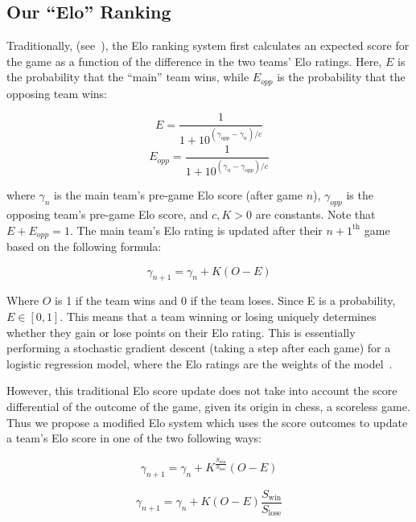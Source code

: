 \documentclass{article}
\begin{document}
\subsection{Our ``Elo'' Ranking}
Traditionally, (see~\cite{mediumRatingSystem}), the Elo ranking system first calculates an expected score for the game as a function of the difference in the two teams' Elo ratings. Here, $E$ is the probability that the ``main'' team wins, while $E_{opp}$ is the probability that the opposing team wins:

\begin{equation}\label{eq:E}
E = \frac{1}{1+10^{(\gamma_{opp}-\gamma_n)/c}}
\end{equation}
\begin{equation}\label{eq:E_opp}
E_{opp} = \frac{1}{1+10^{(\gamma_n-\gamma_{opp})/c}}
\end{equation}

where $\gamma_n$ is the main team's pre-game Elo score (after game $n$), $\gamma_{opp}$ is the opposing team's pre-game Elo score, and $c, K > 0$ are constants. Note that $E + E_{opp} = 1$. The main team's Elo rating is updated after their $n+1^{\text{th}}$ game based on the following formula:

\begin{equation}
\gamma_{n+1} = \gamma_n + K(O - E)
\end{equation}


Where $O$ is 1 if the team wins and 0 if the team loses. Since E is a probability,  $E \in [0, 1]$. This means that a team winning or losing uniquely determines whether they gain or lose points on their Elo rating. This is essentially performing a stochastic gradient descent (taking a step after each game) for a logistic regression model, where the Elo ratings are the weights of the model~\cite{stmorseStatisticalLearning}.

However, this traditional Elo score update does not take into account the score differential of the outcome of the game, given its origin in chess, a scoreless game. Thus we propose a modified Elo system which uses the score outcomes to update a team's Elo score in one of the two following ways: 

\begin{equation}
\label{exponentialUpdate}
\gamma_{n+1} = \gamma_n + K^{\frac{S_{\text{win}}}{S_{\text{lose}}}}(O - E)
\end{equation}


\begin{equation}
\label{multiplyUpdate}
\gamma_{n+1} = \gamma_n + K(O - E)\frac{S_{\text{win}}}{S_{\text{lose}}}
\end{equation}
\end{document}
